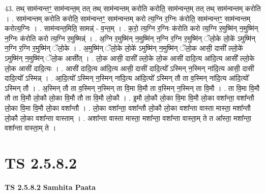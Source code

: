 \documentclass[17pt]{extarticle}
\begin{document}
43. तथ् साम॑न्वन्तꣳ॒॒ साम॑न्वन्त॒म् तत् तथ् साम॑न्वन्तम् करोति करोति॒ साम॑न्वन्त॒म् तत् तथ् साम॑न्वन्तम् करोति । . साम॑न्वन्तम् करोति करोति॒ साम॑न्वन्तꣳ॒॒ साम॑न्वन्तम् करो त्य॒ग्नि र॒ग्निः क॑रोति॒ साम॑न्वन्तꣳ॒॒ साम॑न्वन्तम् करोत्य॒ग्निः । . साम॑न्वन्त॒मिति॒ सामन्न्॑ - व॒न्त॒म् । . क॒रो॒ त्य॒ग्नि र॒ग्निः क॑रोति करो त्य॒ग्नि र॒मुष्मि॑न् न॒मुष्मि॑न् न॒ग्निः क॑रोति करो त्य॒ग्नि र॒मुष्मिन्न्॑ । . अ॒ग्नि र॒मुष्मि॑न् न॒मुष्मि॑न् न॒ग्नि र॒ग्नि र॒मुष्मि॑न् ॅलो॒के लो॒के॑ ऽमुष्मि॑न् न॒ग्नि र॒ग्नि र॒मुष्मि॑न् ॅलो॒के । . अ॒मुष्मि॑न् ॅलो॒के लो॒के॑ ऽमुष्मि॑न् न॒मुष्मि॑न् ॅलो॒क आसी॒ दासी᳚ ल्लो॒के॑ ऽमुष्मि॑न् न॒मुष्मि॑न् ॅलो॒क आसी᳚त् । . लो॒क आसी॒ दासी᳚ ल्लो॒के लो॒क आसी॑ दादि॒त्य आ॑दि॒त्य आसी᳚ ल्लो॒के लो॒क आसी॑ दादि॒त्यः । . आसी॑ दादि॒त्य आ॑दि॒त्य आसी॒ दासी॑ दादि॒त्यो᳚ ऽस्मिन् न॒स्मिन् ना॑दि॒त्य आसी॒ दासी॑ दादि॒त्यो᳚ ऽस्मिन्न् । . आ॒दि॒त्यो᳚ ऽस्मिन् न॒स्मिन् ना॑दि॒त्य आ॑दि॒त्यो᳚ ऽस्मिन् तौ ता व॒स्मिन् ना॑दि॒त्य आ॑दि॒त्यो᳚ ऽस्मिन् तौ । . अ॒स्मिन् तौ ता व॒स्मिन् न॒स्मिन् ता वि॒मा वि॒मौ ता व॒स्मिन् न॒स्मिन् ता वि॒मौ । . ता वि॒मा वि॒मौ तौ ता वि॒मौ लो॒कौ लो॒का वि॒मौ तौ ता वि॒मौ लो॒कौ । . इ॒मौ लो॒कौ लो॒का वि॒मा वि॒मौ लो॒का वशा᳚न्ता॒ वशा᳚न्तौ लो॒का वि॒मा वि॒मौ लो॒का वशा᳚न्तौ । . लो॒का वशा᳚न्ता॒ वशा᳚न्तौ लो॒कौ लो॒का वशा᳚न्ता वास्ता मास्ता॒ मशा᳚न्तौ लो॒कौ लो॒का वशा᳚न्ता वास्ताम् । . अशा᳚न्ता वास्ता मास्ता॒ मशा᳚न्ता॒ वशा᳚न्ता वास्ता॒म् ते त आ᳚स्ता॒ मशा᳚न्ता॒ वशा᳚न्ता वास्ता॒म् ते । \newline
\pagebreak
{}
\section*{ TS 2.5.8.2 }

\textbf{TS 2.5.8.2 } \newline
\textbf{Samhita Paata} \newline
\end{document}
